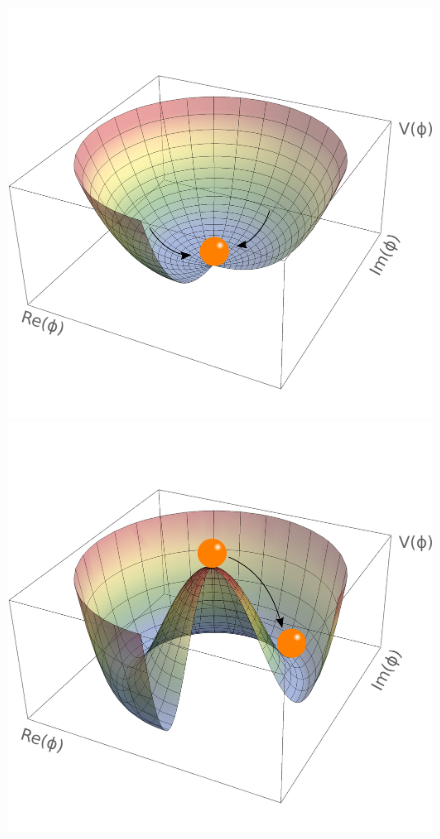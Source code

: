 \begin{figure}
	\centering
	\begin{minipage}{.5\textwidth}
		\centering
		\includegraphics[trim={0cm 1cm 0cm 2cm},clip,width=\linewidth]{./Figures/HiggsV_noEWSB.png}
	\end{minipage}%
	\begin{minipage}{.5\textwidth}
		\centering
		\includegraphics[trim={0cm 1cm 0cm 2cm},clip,width=\linewidth]{./Figures/HiggsV_EWSB.png}
	\end{minipage}
	

\end{figure}
